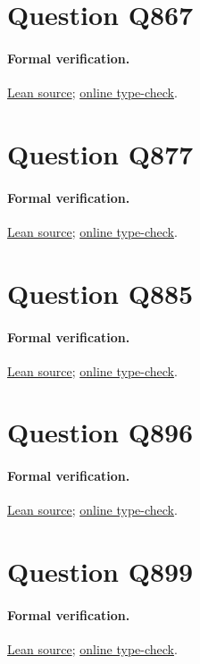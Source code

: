 \documentclass[11pt]{article}
\begin{document}
\section{Question Q867}

\paragraph{Formal verification.}
\href{https://github.com/l-pommeret/rms-math-proofs/blob/87b05a70669162e9224e2305798b1010f6d178fd/lean/RMS/Q867.lean}{Lean source}; \href{https://github.com/l-pommeret/rms-math-proofs/actions/runs/31322711580}{online type-check}.

\section{Question Q877}

\paragraph{Formal verification.}
\href{https://github.com/l-pommeret/rms-math-proofs/blob/1b94690988fe4b3aeb8547c6b915d819b352a0fc/lean/RMS/Q877.lean}{Lean source}; \href{https://github.com/l-pommeret/rms-math-proofs/actions/runs/31316536498}{online type-check}.

\section{Question Q885}

\paragraph{Formal verification.}
\href{https://github.com/l-pommeret/rms-math-proofs/blob/893f806237ffd37ccae90399028a8d8d375f92f2/lean/RMS/Q885.lean}{Lean source}; \href{https://github.com/l-pommeret/rms-math-proofs/actions/runs/31317143904}{online type-check}.

\section{Question Q896}

\paragraph{Formal verification.}
\href{https://github.com/l-pommeret/rms-math-proofs/blob/222f505be53d3e7f1c7cac9e1ea04ea29733f32b/lean/RMS/Q896.lean}{Lean source}; \href{https://github.com/l-pommeret/rms-math-proofs/actions/runs/31319396016}{online type-check}.

\section{Question Q899}

\paragraph{Formal verification.}
\href{https://github.com/l-pommeret/rms-math-proofs/blob/222f505be53d3e7f1c7cac9e1ea04ea29733f32b/lean/RMS/Q899.lean}{Lean source}; \href{https://github.com/l-pommeret/rms-math-proofs/actions/runs/31319396016}{online type-check}.
\end{document}
